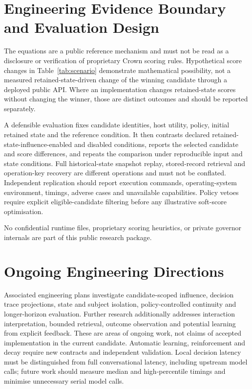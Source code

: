 \documentclass[11pt]{article}
\begin{document}
\section{Engineering Evidence Boundary and Evaluation Design}

The equations are a public reference mechanism and must not be read as a disclosure or verification of proprietary Crown scoring rules. Hypothetical score changes in Table~\ref{tab:scenario} demonstrate mathematical possibility, not a measured retained-state-driven change of the winning candidate through a deployed public API. Where an implementation changes retained-state scores without changing the winner, those are distinct outcomes and should be reported separately.

A defensible evaluation fixes candidate identities, host utility, policy, initial retained state and the reference condition. It then contrasts declared retained-state-influence-enabled and disabled conditions, reports the selected candidate and score differences, and repeats the comparison under reproducible input and state conditions. Full historical-state snapshot replay, stored-record retrieval and operation-key recovery are different operations and must not be conflated. Independent replication should report execution commands, operating-system environment, timings, adverse cases and unavailable capabilities. Policy vetoes require explicit eligible-candidate filtering before any illustrative soft-score optimisation.

No confidential runtime files, proprietary scoring heuristics, or private governor internals are part of this public research package.

\section{Ongoing Engineering Directions}

Associated engineering plans investigate candidate-scoped influence, decision trace projections, state and subject isolation, policy-controlled continuity and longer-horizon evaluation. Further research additionally addresses interaction interpretation, bounded retrieval, outcome observation and potential learning from explicit feedback. These are areas of ongoing work, not claims of accepted implementation in the current candidate. Automatic learning, reinforcement and decay require new contracts and independent validation. Local decision latency must be distinguished from full conversational latency, including upstream model calls; future work should measure median and high-percentile timings and minimise unnecessary serial model calls.
\end{document}
